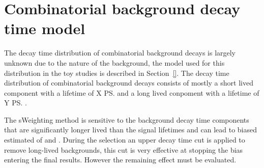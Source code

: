 {\section{Combinatorial background decay time model}
\label{sec:CBGdecytimemodel}

The decay time distribution of combinatorial background decays is largely unknown due to the nature of the background, the model used for this distribution in the toy studies is described in Section~\ref{}. The decay time distribution of combinatorial background decays consists of mostly a short lived component with a lifetime of X \ps and a long lived conpoment with a lifetime of Y \ps.

The sWeighting method is sensitive to the background decay time components that are significantly longer lived than the signal lifetimes and can lead to biased estimated of \tmumu and \Gmumu. 
During the selection an upper decay time cut is applied to remove long-lived backgrounds, this cut is very effective at stopping the bias entering the final results. However the remaining effect must be evaluated.

}
